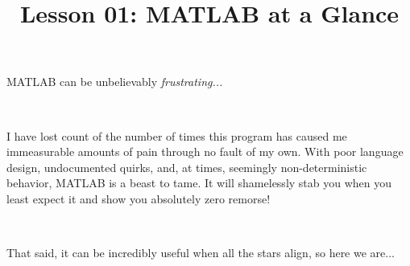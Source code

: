 \documentclass{article}
\title{Lesson 01: MATLAB at a Glance}
\begin{document}
\renderTitle

\noindent
MATLAB can be unbelievably \emph{frustrating...}

\

\noindent
I have lost count of the number of times this program has caused me
immeasurable amounts of pain through no fault of my own. With poor
language design, undocumented quirks, and, at times, seemingly
non-deterministic behavior, MATLAB is a beast to tame.  It will
shamelessly stab you when you least expect it and show you absolutely
zero remorse!

\

\noindent
That said, it can be incredibly useful when all the stars align, so here
we are...
\end{document}
